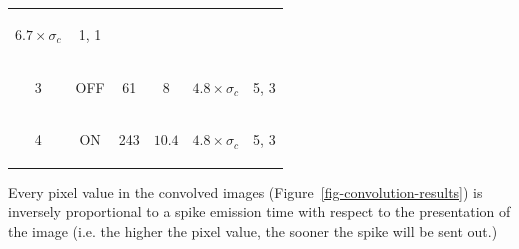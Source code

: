 \documentclass{frontiersENG} %
\newenvironment{mycell}[1]
{
	\begin{minipage}{#1}
		\begin{center}
			\vspace*{0.15cm}
		}
		{
			\vspace*{0.1cm}
		\end{center}
	\end{minipage}
}
\begin{document}
\begin{table}[htb]
\begin{center}
\begin{tabular}{c c c c c c}
      \begin{mycell}{1.6cm}$6.7 \times \sigma_c$ \end{mycell}& 
      \begin{mycell}{1.6cm}1, 1 \end{mycell}\\
			\begin{mycell}{0.8cm} 3 \end{mycell} &
			\begin{mycell}{1.1cm} \textsc{OFF}\end{mycell} & 
			\begin{mycell}{1.1cm} 61 \end{mycell}& 
			\begin{mycell}{1.6cm}$8$ \end{mycell}& 
      \begin{mycell}{1.6cm}$4.8 \times \sigma_c$ \end{mycell}& 
      \begin{mycell}{1.6cm}5, 3\end{mycell} \\
			\begin{mycell}{0.8cm} 4  \end{mycell} & 
			\begin{mycell}{1.1cm} \textsc{ON} \end{mycell} & 
			\begin{mycell}{1.1cm} 243 \end{mycell} &
			\begin{mycell}{1.6cm}$10.4$\end{mycell} & 
      \begin{mycell}{1.6cm}$4.8 \times \sigma_c$\end{mycell} & 
      \begin{mycell}{1.6cm}5, 3 \end{mycell}
		\end{tabular}
	\end{center}
	\label{tab-kernel-specs}
\end{table}

Every pixel value in the convolved images (Figure~\ref{fig-convolution-results}) 
is inversely proportional to a spike emission time with respect to the presentation of the image (i.e. the higher the pixel value, the sooner the spike will be sent out.)
\end{document}

